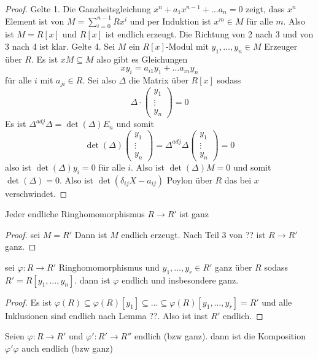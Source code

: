 \begin{proof}
	Gelte 1. Die Ganzheitsgleichung \(x^n+a_1x^{n-1}+\dots a_n=0\) zeigt, dass \(x^n\) Element ist von \(M=\sum_{i=0}^{n-1}Rx^i\) und per Induktion ist \(x^m\in M\) für alle \(m\).
	Also ist \(M=R[x]\) und \(R[x]\) ist endlich erzeugt. Die Richtung von 2 nach 3 und von 3 nach 4 ist klar.
	Gelte 4. Sei \(M\) ein \(R[x]\)-Modul mit \(y_1,\dots,y_n\in M\) Erzeuger über \(R\).
	Es ist \(xM\subseteq M\) also gibt es Gleichungen 
	\[xy_i=a_{i1}y_1+\dots a_{in}y_n\] für alle \(i\) mit \(a_{ji}\in R\).
	Sei also \(\Delta\) die Matrix über \(R[x]\) sodass 
	\[\Delta\cdot\begin{pmatrix}
		y_1\\ \vdots \\ y_n
	\end{pmatrix}=0\]
	Es ist \(\Delta^{adj}\Delta=\det(\Delta)E_n\) und somit 
	\[\det(\Delta)\begin{pmatrix}
		y_1\\ \vdots \\y_n
	\end{pmatrix}=\Delta^{adj}\Delta\begin{pmatrix}
		y_1\\ \vdots \\y_n
	\end{pmatrix}=0\] also ist \(\det(\Delta)y_i=0\) für alle \(i\).
	Also ist \(\det(\Delta)M=0\) und somit \(\det(\Delta)=0\).
	Also ist \(\det(\delta_{ij}X-a_{ij})\) Poylon über \(R\) das bei \(x\) verschwindet.
	
\end{proof}
\begin{Kor}
	Jeder endliche Ringhomomorphismus \(R\to R'\) ist ganz 
\end{Kor}
\begin{proof}
	sei \(M=R'\) Dann ist \(M\) endlich erzeugt. Nach Teil 3 von ?? ist \(R\to R'\) ganz.
\end{proof}
\begin{Kor}
	sei \(\varphi\colon R\to R'\) Ringhomomorphismus und \(y_1,\dots,y_r\in R'\) ganz über \(R\) sodass \(R'=R[y_1,\dots,y_n]\).
	dann ist \(\varphi\) endlich und insbesondere ganz.
\end{Kor}
\begin{proof}
	Es ist \(\varphi(R)\subseteq\varphi(R)[y_1]\subseteq\dots\subseteq \varphi(R)[y_1,\dots,y_r]=R'\) und alle Inklusionen sind endlich nach Lemma ??. Also ist inst \(R'\) endlich.
\end{proof}
\begin{Kor}
	Seien \(\varphi\colon R\to R'\) und \(\varphi'\colon R'\to R''\) endlich (bzw ganz). dann ist die Komposition \(\varphi'\varphi\) auch endlich (bzw ganz)
\end{Kor}
